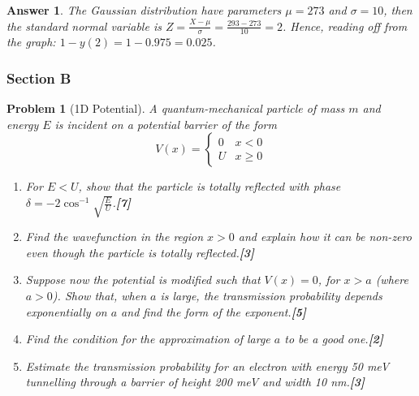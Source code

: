 \documentclass[a4paper]{article}
\newtheorem{ans}{Answer}[subsection]
\theoremstyle{new}
\newtheorem{qns}{Problem}[subsection]
\begin{document}
\begin{ans}
The Gaussian distribution have parameters $\mu=273$ and $\sigma=10$, then the standard normal variable is $Z=\frac{X-\mu}{\sigma}=\frac{293-273}{10}=2$. Hence, reading off from the graph: $1-y(2)=1-0.975=0.025$.
\end{ans}
\newpage
\subsubsection{Section B}
\begin{qns}[1D Potential]
A quantum-mechanical particle of mass $m$ and energy $E$ is incident on a potential barrier of the form 
$$V(x)=
\left\{
        \begin{array}{ll}
      0 & x<0 \\
      U & x\geq0
        \end{array}
    \right.$$
\begin{enumerate}[label=(\roman*)]
\item For $E < U$, show that the particle is totally reflected with phase $\delta=-2\cos^{-1}\sqrt{\frac{E}{U}}$.\hfill\textbf{[7]}
\item Find the wavefunction in the region $x > 0$ and explain how it can be non-zero even though the particle is totally reflected.\hfill\textbf{[3]}
\item Suppose now the potential is modified such that $V(x) = 0$, for $x > a$ (where $a > 0$). Show that, when $a$ is large, the transmission probability depends exponentially on $a$ and find the form of the exponent.\hfill\textbf{[5]}
\item Find the condition for the approximation of large $a$ to be a good one.\hfill\textbf{[2]}
\item Estimate the transmission probability for an electron with energy 50 meV tunnelling through a barrier of height 200 meV and width 10 nm.\hfill\textbf{[3]}
\end{enumerate}
\end{qns}
\end{document}
